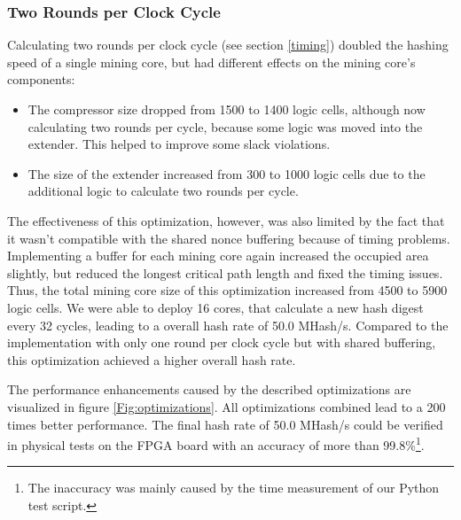 
\subsubsection*{Two Rounds per Clock Cycle}
Calculating two rounds per clock cycle (see section \ref{timing}) doubled the hashing speed of a single mining core, but had different effects on the mining core's components:
\begin{itemize}
    \item The compressor size dropped from 1500 to 1400 logic cells, although now calculating two rounds per cycle, because some logic was moved into the extender. This helped to improve some slack violations.
    \item The size of the extender increased from 300 to 1000 logic cells due to the additional logic to calculate two rounds per cycle.
\end{itemize}
The effectiveness of this optimization, however, was also limited by the fact that it wasn't compatible with the shared nonce buffering because of timing problems. Implementing a buffer for each mining core again increased the occupied area slightly, but reduced the longest critical path length and fixed the timing issues. Thus, the total mining core size of this optimization increased from 4500 to 5900 logic cells. We were able to deploy 16 cores, that calculate a new hash digest every 32 cycles, leading to a overall hash rate of 50.0 MHash/s. Compared to the implementation with only one round per clock cycle but with shared buffering, this optimization achieved a higher overall hash rate.

The performance enhancements caused by the described optimizations are visualized in figure \ref{Fig:optimizations}. All optimizations combined lead to a 200 times better performance. The final hash rate of 50.0 MHash/s could be verified in physical tests on the FPGA board with an accuracy of more than 99.8\%\footnote{The inaccuracy was mainly caused by the time measurement of our Python test script.}.

